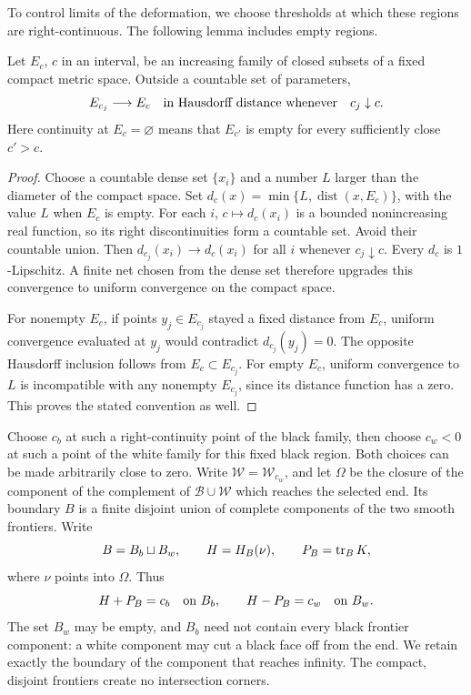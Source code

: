 To control limits of the deformation, we choose thresholds at which these
regions are right-continuous.  The following lemma includes empty regions.

\begin{lemma}\label{n3:domains:right-continuity}
Let $E_c$, $c$ in an interval, be an increasing family of closed
subsets of a fixed compact metric space.  Outside a countable set of
parameters,
\begin{equation}\label{n3:domains:hausdorff-right}
 E_{c_j}\longrightarrow E_c\quad\hbox{in Hausdorff distance whenever}
 \quad c_j\downarrow c.
\end{equation}
Here continuity at $E_c=\varnothing$ means that $E_{c'}$ is empty
for every sufficiently close $c'>c$.
\end{lemma}

\begin{proof}
Choose a countable dense set $\{x_i\}$ and a number $L$ larger than
the diameter of the compact space.  Set
$d_c(x)=\min\{L,\operatorname{dist}(x,E_c)\}$, with the value $L$
when $E_c$ is empty.  For each $i$, $c\mapsto d_c(x_i)$ is a
bounded nonincreasing real function, so its right discontinuities
form a countable set.  Avoid their countable union.  Then
$d_{c_j}(x_i)\to d_c(x_i)$ for all $i$ whenever $c_j\downarrow c$.
Every $d_c$ is $1$-Lipschitz.  A finite net chosen from the dense set
therefore upgrades this convergence to uniform convergence on the
compact space.

For nonempty $E_c$, if points $y_j\in E_{c_j}$ stayed a fixed
distance from $E_c$, uniform convergence evaluated at $y_j$ would
contradict $d_{c_j}(y_j)=0$.  The opposite Hausdorff inclusion follows
from $E_c\subset E_{c_j}$.  For empty $E_c$, uniform convergence to
$L$ is incompatible with any nonempty $E_{c_j}$, since its distance
function has a zero.  This proves the stated convention as well.
\end{proof}

Choose $c_b$ at such a right-continuity point of the black family,
then choose $c_w<0$ at such a point of the white family for this
fixed black region.  Both choices can be made arbitrarily close to
zero.  Write $\mathcal W=\mathcal W_{c_w}$, and let $\Omega$ be the
closure of the component of the complement of
$\mathcal B\cup\mathcal W$ which reaches the selected end.  Its
boundary $B$ is a finite disjoint union of complete components of
the two smooth frontiers.  Write
\begin{equation}\label{n3:domains:faces}
 B=B_b\sqcup B_w,\qquad
 H=H_B(\nu),\qquad P_B=\operatorname{tr}_BK,
\end{equation}
where $\nu$ points into $\Omega$.  Thus
\begin{equation}\label{n3:domains:face-expansions}
 H+P_B=c_b\quad\hbox{on }B_b,
 \qquad
 H-P_B=c_w\quad\hbox{on }B_w.
\end{equation}
The set $B_w$ may be empty, and $B_b$ need not contain every black
frontier component: a white component may cut a black face off from
the end.  We retain exactly the boundary of the component that reaches
infinity.  The compact, disjoint frontiers create no intersection corners.


